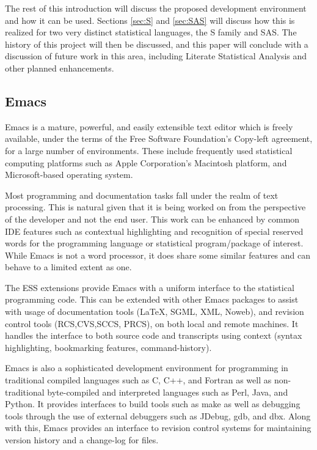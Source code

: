 \documentclass{article}
\begin{document}
The rest of this introduction will discuss the proposed development
environment and how it can be used.  Sections \ref{sec:S} and
\ref{sec:SAS} will discuss how this is realized for two very distinct
statistical languages, the S family and SAS.  The history of this
project will then be discussed, and this paper will conclude with a
discussion of future work in this area, including Literate Statistical
Analysis and other planned enhancements.

\subsection{Emacs}
\label{sec:intro:emacs}

Emacs \citep{RMS:2000} is a mature, powerful, and easily extensible
text editor which is freely available, under the terms of the Free
Software Foundation's Copy-left agreement, for a large number of
environments.  These include frequently used statistical computing
platforms such as Apple Corporation's Macintosh platform, and
Microsoft-based operating system.  

Most programming and documentation tasks fall under the realm of text
processing.  This is natural given that it is being worked on from the
perspective of the developer and not the end user.  This work can be
enhanced by common IDE features such as contextual highlighting and
recognition of special reserved words for the programming language or
statistical program/package of interest.  While Emacs is not a word
processor, it does share some similar features and can behave to a
limited extent as one.

The ESS extensions provide Emacs with a uniform interface to the
statistical programming code.  This can be extended with other Emacs
packages to assist with usage of documentation tools (\LaTeX, SGML,
XML, Noweb), and revision control tools (RCS,CVS,SCCS, PRCS), on both
local and remote machines.  It handles the interface to both source
code and transcripts using context (syntax highlighting, bookmarking
features, command-history).

Emacs is also a sophisticated development environment for programming
in traditional compiled languages such as C, C++, and Fortran as well
as non-traditional byte-compiled and interpreted languages such as
Perl, Java, and Python.  It provides interfaces to build tools such as
make as well as debugging tools through the use of external debuggers
such as JDebug, gdb, and dbx. Along with this, Emacs provides an
interface to revision control systems for maintaining version history
and a change-log for files.
\end{document}
